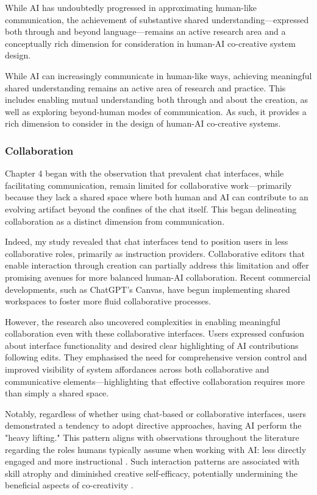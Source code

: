 While AI has undoubtedly progressed in approximating human-like communication, the achievement of substantive shared understanding—expressed both through and beyond language—remains an active research area and a conceptually rich dimension for consideration in human-AI co-creative system design.

While AI can increasingly communicate in human-like ways, achieving meaningful shared understanding remains an active area of research and practice. This includes enabling mutual understanding both through and about the creation, as well as exploring beyond-human modes of communication. As such, it provides a rich dimension to consider in the design of human-AI co-creative systems.

\subsubsection{Collaboration}

Chapter 4 began with the observation that prevalent chat interfaces, while facilitating communication, remain limited for collaborative work—primarily because they lack a shared space where both human and AI can contribute to an evolving artifact beyond the confines of the chat itself. This began delineating collaboration as a distinct dimension from communication. 

Indeed, my study revealed that chat interfaces tend to position users in less collaborative roles, primarily as instruction providers. Collaborative editors that enable interaction through creation can partially address this limitation and offer promising avenues for more balanced human-AI collaboration. Recent commercial developments, such as ChatGPT's Canvas, have begun implementing shared workspaces to foster more fluid collaborative processes.

However, the research also uncovered complexities in enabling meaningful collaboration even with these collaborative interfaces. Users expressed confusion about interface functionality and desired clear highlighting of AI contributions following edits. They emphasised the need for comprehensive version control and improved visibility of system affordances across both collaborative and communicative elements—highlighting that effective collaboration requires more than simply a shared space.

Notably, regardless of whether using chat-based or collaborative interfaces, users demonstrated a tendency to adopt directive approaches, having AI perform the "heavy lifting." This pattern aligns with observations throughout the literature regarding the roles humans typically assume when working with AI: less directly engaged and more instructional \cite{Palani2024-on}. Such interaction patterns are associated with skill atrophy and diminished creative self-efficacy, potentially undermining the beneficial aspects of co-creativity \cite{Lee2025-dw, McGuire2024-im}.

